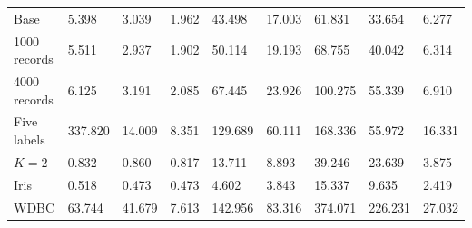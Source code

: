 \begin{tabular}{lllllllll}
Base & 5.398 & 3.039 & 1.962 & 43.498 & 17.003 & 61.831 & 33.654 & 6.277 \\
1000 records & 5.511 & 2.937 & 1.902 & 50.114 & 19.193 & 68.755 & 40.042 & 6.314 \\
4000 records & 6.125 & 3.191 & 2.085 & 67.445 & 23.926 & 100.275 & 55.339 & 6.910 \\
Five labels & 337.820 & 14.009 & 8.351 & 129.689 & 60.111 & 168.336 & 55.972 & 16.331 \\
$K=2$ & 0.832 & 0.860 & 0.817 & 13.711 & 8.893 & 39.246 & 23.639 & 3.875 \\
Iris & 0.518 & 0.473 & 0.473 & 4.602 & 3.843 & 15.337 & 9.635 & 2.419 \\
WDBC & 63.744 & 41.679 & 7.613 & 142.956 & 83.316 & 374.071 & 226.231 & 27.032 \\
\end{tabular}

